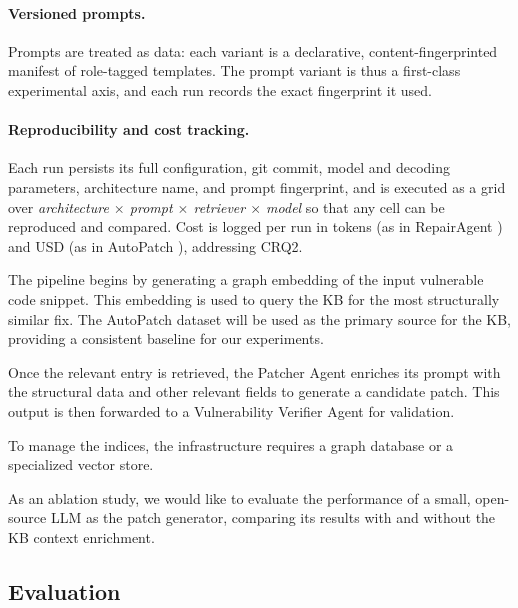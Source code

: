 \documentclass[11pt, a4paper]{article}
\begin{document}
\paragraph{Versioned prompts.} Prompts are treated as data: each variant is a
declarative, content-fingerprinted manifest of role-tagged templates. The prompt
variant is thus a first-class experimental axis, and each run records the exact
fingerprint it used.

\paragraph{Reproducibility and cost tracking.} Each run persists its full
configuration, git commit, model and decoding parameters, architecture name, and
prompt fingerprint, and is executed as a grid over \emph{architecture $\times$
prompt $\times$ retriever $\times$ model} so that any cell can be reproduced and
compared. Cost is logged per run in tokens (as in RepairAgent
\cite{bouzenia2025repairagent}) and USD (as in AutoPatch
\cite{Seo2025AutoPatchMF}), addressing CRQ2.


The pipeline begins by generating a graph embedding of the input vulnerable code snippet.
This embedding is used to query the KB for the most structurally similar fix. 
The AutoPatch dataset will be used as the primary source for the KB, providing a consistent baseline for our experiments.

Once the relevant entry is retrieved, the Patcher Agent enriches its prompt with the structural data and other relevant fields to generate a candidate patch.
This output is then forwarded to a Vulnerability Verifier Agent for validation.

To manage the indices, the infrastructure requires a graph database or a specialized vector store.

As an ablation study, we would like to evaluate the performance of a small, open-source LLM  as the patch generator, comparing its results with and without the KB context enrichment.



\subsection*{Evaluation}

\end{document}
